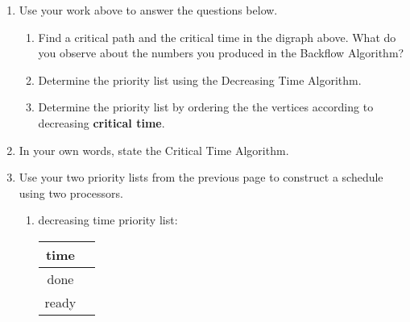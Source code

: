 \documentclass[12pt]{article}
\renewcommand{\emph}[1]{\textsf{\textbf{#1}}}
\begin{document}
\begin{enumerate}
\item Use your work above to answer the questions below.
	\begin{enumerate}
	\item Find a critical path and the critical time in the digraph above. What do you observe about the numbers you produced in the Backflow Algorithm?
	\vfill
	\item Determine the priority list using the Decreasing Time Algorithm.
	\vfill
	\item Determine the priority list by ordering the the vertices according to decreasing \emph{critical time}.
	\vfill
	\end{enumerate}
\newpage
\item In your own words, state the Critical Time Algorithm.
\vspace{.5in}
\item Use your two priority lists from the previous page to construct a schedule using two processors.\\
	\begin{enumerate}
	\item decreasing time priority list: \underline{\hspace{2in}}\\
	
\hspace*{-1in}	\begin{tabular}{c || c}
time &   \quad \hspace{6in} \quad \\ \hline
done& \\ \hline
ready& \\ \hline
\end{tabular}

\vfill
	

\end{enumerate}
\end{enumerate}
\end{document}
